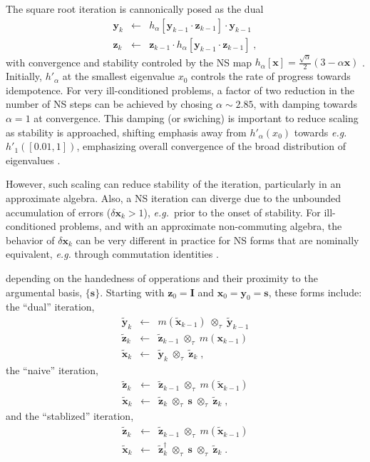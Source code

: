 \documentclass[letterpaper,twocolumn,amsmath,amsfont,amssymb,english,aps,jcp,preprintnumbers,groupaddress,nofootinbib,tightenlines]{revtex4}
\newcommand{\mat}[1]{\boldsymbol{#1}}
\newcommand{\mmat}[1]{\widetilde{\boldsymbol{#1}}}
\newcommand{\ot}{ {\scriptstyle \otimes}_{ \tau } }
\begin{document}
The square root iteration is cannonically posed as the dual \cite{}
\begin{eqnarray}
\mat{y}_k &\leftarrow& h_\alpha \left[ \mat{y}_{k-1} \cdot \mat{z}_{k-1} \right] \cdot \mat{y}_{k-1}  \\ 
\mat{z}_k &\leftarrow& \mat{z}_{k-1} \cdot h_\alpha \left[ \mat{y}_{k-1} \cdot \mat{z}_{k-1} \right] \; ,
\end{eqnarray}
with convergence and stability controled by the NS map $h_\alpha[\mat{x}]=\frac{\sqrt{\alpha}}{2} \left(3-\alpha \mat{x} \right)$  \cite{}.
Initially, $h'_\alpha$ at the smallest eigenvalue $x_0$ controls the rate of progress towards idempotence.  
For very ill-conditioned problems, a factor of two reduction in the number of NS steps can be achieved 
by chosing $\alpha \sim 2.85$, with damping towards $\alpha=1$ at convergence.   This damping (or swiching) is 
important to reduce scaling as stability is approached, shifting emphasis away from $h'_\alpha \left(x_0\right)$ 
towards {\em e.g.} $h'_1 ([0.01,1])$, emphasizing overall convergence of the broad distribution of eigenvalues \cite{Pan and Scriber}. 

However, such scaling can reduce stability of the iteration, particularly in an approximate algebra.  
Also, a NS iteration can diverge due to the unbounded accumulation of errors ($\delta \mat{x}_k > 1 $), {\em e.g.}~prior
to the onset of stability.  For ill-conditioned problems, and with an approximate non-commuting algebra, the 
behavior of $\delta \mat{x}_k $ can be very different in practice for NS forms that are nominally equivalent, 
{\em e.g.} through commutation identities \cite{higham2006}.     

depending on the handedness of opperations and their proximity to the argumental basis, $\{ \mat{s} \}$.  
Starting with $\mat{z}_0=\mat{I}$ and $\mat{x}_0=\mat{y}_0=\mat{s}$, these forms include: the ``dual'' iteration,
\begin{eqnarray} \label{dualsiteration}
\mmat{y}_{k}  &\leftarrow& m \left( \mmat{x}_{k-1} \right) \; \ot \;  \mmat{y}_{k-1}  \\
\mmat{z}_{k}  &\leftarrow& \mmat{z}_{k-1}  \; \ot \;  m \left( \mat{x}_{k-1} \right) \\
\mmat{x}_{k} &\leftarrow& \mmat{y}_{k} \; \ot \; \mmat{z}_{k} \; ,
\end{eqnarray}
the ``naive'' iteration,
\begin{eqnarray}
\mmat{z}_{k}  &\leftarrow& \mmat{z}_{k-1} \; \ot \; m \left( \mmat{x}_{k-1} \right) \\
\mmat{x}_{k} &\leftarrow& \mmat{z}_{k} \; \ot \; \mat{s} \; \ot \; \mmat{z}_{k} \; ,
\end{eqnarray}
and the ``stablized'' iteration,
\begin{eqnarray}
\mmat{z}_{k}  &\leftarrow& \mmat{z}_{k-1}  \; \ot \; m \left( \mmat{x}_{k-1} \right) \\
\mmat{x}_{k} &\leftarrow& \mmat{z}^\dagger_{k} \; \ot \; \mat{s} \; \ot \; \mmat{z}_{k} \; .
\end{eqnarray}
\end{document}

